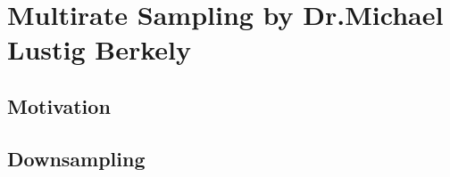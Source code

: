 
\chapter{Multirate Sampling by Dr.Michael Lustig Berkely}


\section{Motivation}



\section{Downsampling}


